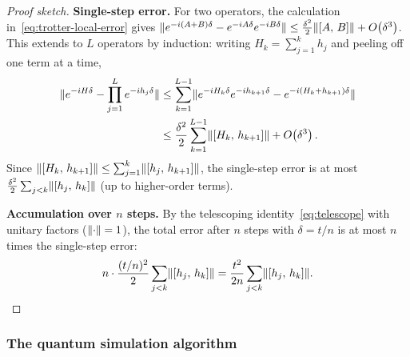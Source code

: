 \begin{proof}[Proof sketch]
  \textbf{Single-step error.}
  For two operators, the calculation in~\eqref{eq:trotter-local-error}
  gives
  $\lVert e^{-i(A+B)\delta} - e^{-iA\delta}e^{-iB\delta} \rVert
  \le \frac{\delta^2}{2}\lVert [A,\,B] \rVert + O\!\left(\delta^3\right)$.
  This extends to $L$ operators by induction: writing
  $H_k = \sum_{j=1}^k h_j$ and peeling off one term at a time,
  \begin{align}
    \lVert e^{-iH\delta} - \prod_{j=1}^L e^{-ih_j\delta} \rVert
    &\le \sum_{k=1}^{L-1}
    \lVert e^{-iH_k\delta}e^{-ih_{k+1}\delta} - e^{-i(H_k+h_{k+1})\delta} \rVert
    \nonumber\\
    &\le \frac{\delta^2}{2}\sum_{k=1}^{L-1}\lVert [H_k,\,h_{k+1}] \rVert
    + O\!\left(\delta^3\right).
  \end{align}
  Since $\lVert [H_k,\,h_{k+1}] \rVert \le \sum_{j=1}^k \lVert [h_j,\,h_{k+1}] \rVert$,
  the single-step error is at most
  $\frac{\delta^2}{2}\sum_{j<k}\lVert [h_j,\,h_k] \rVert$ (up to
  higher-order terms).

  \textbf{Accumulation over $n$ steps.}
  By the telescoping identity~\eqref{eq:telescope} with unitary factors
  ($\lVert \cdot \rVert=1$), the total error after $n$ steps with
  $\delta=t/n$ is at most $n$ times the single-step error:
  \[
    n\cdot \frac{(t/n)^2}{2}\sum_{j<k}\lVert [h_j,\,h_k] \rVert
    = \frac{t^2}{2n}\sum_{j<k}\lVert [h_j,\,h_k] \rVert.
    \qedhere
  \]
\end{proof}

\subsubsection{The quantum simulation algorithm}

